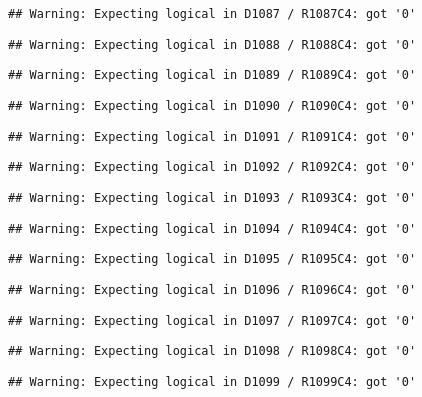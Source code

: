 \documentclass[
]{article}
\begin{document}
\begin{verbatim}
## Warning: Expecting logical in D1087 / R1087C4: got '0'
\end{verbatim}

\begin{verbatim}
## Warning: Expecting logical in D1088 / R1088C4: got '0'
\end{verbatim}

\begin{verbatim}
## Warning: Expecting logical in D1089 / R1089C4: got '0'
\end{verbatim}

\begin{verbatim}
## Warning: Expecting logical in D1090 / R1090C4: got '0'
\end{verbatim}

\begin{verbatim}
## Warning: Expecting logical in D1091 / R1091C4: got '0'
\end{verbatim}

\begin{verbatim}
## Warning: Expecting logical in D1092 / R1092C4: got '0'
\end{verbatim}

\begin{verbatim}
## Warning: Expecting logical in D1093 / R1093C4: got '0'
\end{verbatim}

\begin{verbatim}
## Warning: Expecting logical in D1094 / R1094C4: got '0'
\end{verbatim}

\begin{verbatim}
## Warning: Expecting logical in D1095 / R1095C4: got '0'
\end{verbatim}

\begin{verbatim}
## Warning: Expecting logical in D1096 / R1096C4: got '0'
\end{verbatim}

\begin{verbatim}
## Warning: Expecting logical in D1097 / R1097C4: got '0'
\end{verbatim}

\begin{verbatim}
## Warning: Expecting logical in D1098 / R1098C4: got '0'
\end{verbatim}

\begin{verbatim}
## Warning: Expecting logical in D1099 / R1099C4: got '0'
\end{verbatim}
\end{document}
